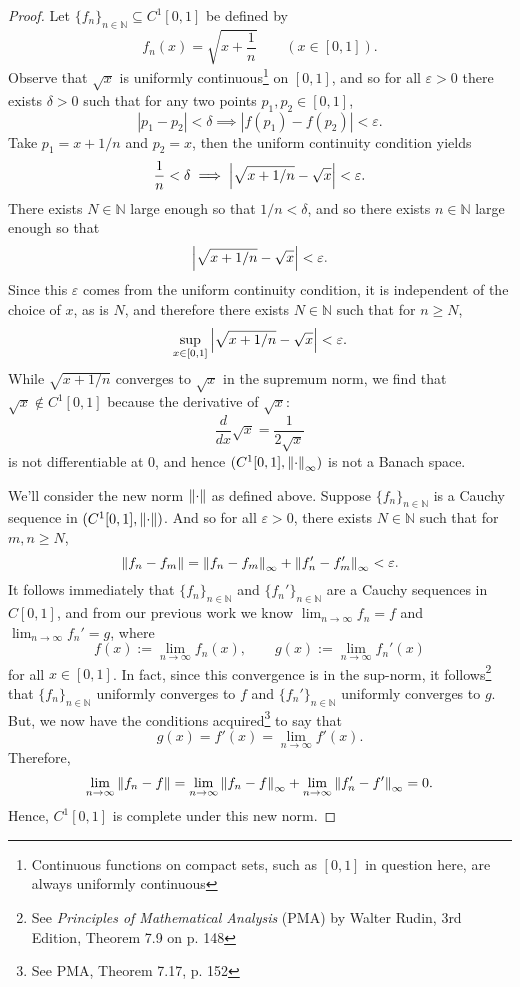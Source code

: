 \documentclass[12pt]{article}
\theoremstyle{definition}
\begin{document}
		\begin{proof}
			Let $\{f_n\}_{n \in \mathbb{N}} \subseteq C^1[0, 1]$ be defined by $$f_n(x) = \sqrt{x + \frac{1}{n}} \qquad (x \in [0, 1]).$$ Observe that $\sqrt{x}$ is uniformly continuous\footnote{Continuous functions on compact sets, such as $[0, 1]$ in question here, are always uniformly continuous} on $[0, 1]$, and so for all $\varepsilon > 0$ there exists $\delta > 0$ such that for any two points $p_1, p_2 \in [0, 1]$, $$|p_1 - p_2| < \delta \implies |f(p_1) - f(p_2)| < \varepsilon.$$  Take $p_1 = x + 1/n$ and $p_2 = x$, then the uniform continuity condition yields $$\frac{1}{n} < \delta \implies \abs{\sqrt{x + 1/n} - \sqrt{x}} < \varepsilon.$$ There exists $N \in \mathbb{N}$ large enough so that $1/n < \delta$, and so there exists $n \in \mathbb{N}$ large enough so that $$\abs{\sqrt{x + 1/n} - \sqrt{x}} < \varepsilon.$$ Since this $\varepsilon$ comes from the uniform continuity condition, it is independent of the choice of $x$, as is $N$, and therefore there exists $N \in \mathbb{N}$ such that for $n \geq N$, $$\sup_{x \in [0, 1]} \abs{\sqrt{x + 1/n} - \sqrt{x}} < \varepsilon.$$ While $\sqrt{x + 1/n}$ converges to $\sqrt{x}$ in the supremum norm, we find that $\sqrt{x} \notin C^1[0, 1]$ because the derivative of $\sqrt{x}$: $$\frac{d}{dx} \sqrt{x} = \frac{1}{2 \sqrt{x}}$$ is not differentiable at 0, and hence $(C^1[0, 1], \norm{\cdot}_\infty)$ is not a Banach space. 
			
			
			
			We'll consider the new norm $\norm{\cdot}$ as defined above. Suppose $\{f_n\}_{n \in \mathbb{N}}$ is a Cauchy sequence in $(C^1[0, 1], \norm{\cdot})$. And so for all $\varepsilon > 0$, there exists $N \in \mathbb{N}$ such that for $m,n \geq N$, $$\norm{f_n - f_m} = \norm{f_n - f_m}_\infty + \norm{f_n' - f_m'}_\infty < \varepsilon.$$ It follows immediately that $\{f_n\}_{n \in \mathbb{N}}$ and $\{f_n'\}_{n \in \mathbb{N}}$ are a Cauchy sequences in $C[0,1]$, and from our previous work we know $\lim_{n \to \infty} f_n = f$ and $\lim_{n \to \infty} f_n' = g$, where $$f(x) := \lim_{n \to \infty} f_n(x), \qquad g(x) := \lim_{n \to \infty} f_n'(x)$$ for all $x \in [0, 1]$. In fact, since this convergence is in the sup-norm, it follows\footnote{See \textit{Principles of Mathematical Analysis} (PMA) by Walter Rudin, 3rd Edition, Theorem 7.9 on p. 148} that $\{f_n\}_{n \in \mathbb{N}}$ uniformly converges to $f$ and $\{f_n'\}_{n \in \mathbb{N}}$ uniformly converges to $g$. But, we now have the conditions acquired\footnote{See PMA, Theorem 7.17, p. 152} to say that $$g(x) = f'(x) = \lim_{n \to \infty} f'(x).$$ Therefore, $$\lim_{n \to \infty} \norm{f_n - f} = \lim_{n \to \infty} \norm{f_n - f}_\infty + \lim_{n \to \infty} \norm{f_n' - f'}_\infty = 0.$$ Hence, $C^1[0,1]$ is complete under this new norm. 
		\end{proof}
	
\end{document}
